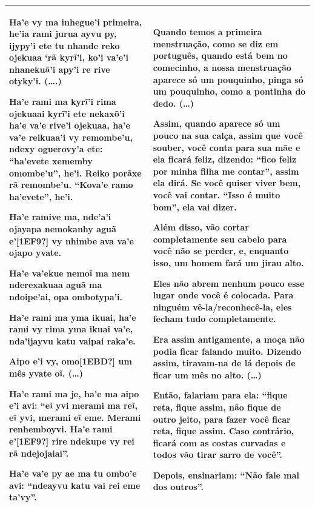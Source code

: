 \begin{flushleft}
\tablehead{}
\begin{supertabular}{m{2.87756in}|m{2.87886in}}
Ha’e vy ma inhegue’i primeira, he’ia rami jurua ayvu py, ijypy’i ete tu
nhande reko ojekuaa ‘rã kyrĩ’i, ko’i va’e’i nhanekuã’i apy’i re rive
otyky’i. (\ldots{}.)

Ha’e rami ma kyrĩ’i rima ojekuaai kyrĩ’i ete nekaxõ’i ha’e va’e
rive’i ojekuaa, ha’e va’e reikuaa’i vy remombe’u, ndexy oguerovy’a ete:
``ha’evete xememby omombe’u'', he’i. Reiko porãxe rã remombe’u. ``Kova’e
ramo ha’evete'', he’i.

Ha’e ramive ma, nde’a’i ojayapa nemokanhy aguã e’[1EF9?] vy nhimbe ava
va’e ojapo yvate. 

Ha’e va’ekue nemoĩ ma nem nderexakuaa aguã ma ndoipe’ai, opa
ombotypa’i. 

Ha’e rami ma yma ikuai, ha’e rami vy rima yma ikuai va’e, nda’ijayvu
katu vaipai raka’e.

Aipo e’i vy, omo[1EBD?] um mês yvate oĩ. (\ldots{})

Ha’e rami ma je, ha’e ma aipo e’i avi: ``eĩ yvi merami ma reĩ,
eĩ yvi, merami eĩ eme. Merami renhemboyvi. Ha’e rami e’[1EF9?]
rire ndekupe vy rei rã ndejojaiai''. 

Ha’e va’e py ae ma tu ombo’e avi: ``ndeayvu katu vai rei eme ta’vy''.  &
Quando temos a primeira menstruação, como se diz em português, quando
está bem no comecinho, a nossa menstruação aparece só um pouquinho,
pinga só um pouquinho, como a pontinha do dedo. (\ldots{})

Assim, quando aparece só um pouco na sua calça, assim que você souber,
você conta para sua mãe e ela ficará feliz, dizendo: ``fico feliz por
minha filha me contar'', assim ela dirá.  Se você quiser viver bem, você
vai contar. ``Isso é muito bom'', ela vai dizer. 

Além disso, vão cortar completamente seu cabelo para você não se perder,
e, enquanto isso, um homem fará um jirau alto. 

Eles não abrem nenhum pouco esse lugar onde você é colocada. Para
ninguém vê-la/reconhecê-la, eles fecham tudo completamente.

Era assim antigamente, a moça não podia ficar falando muito. Dizendo
assim, tiravam-na de lá depois de ficar um mês no alto. (\ldots{})

Então, falariam para ela: ``fique reta, fique assim, não fique de outro
jeito, para fazer você ficar reta, fique assim. Caso contrário, ficará
com as costas curvadas e todos vão tirar sarro de você''.  

Depois, ensinariam: ``Não fale mal dos outros''.\\\hline
\end{supertabular}
\end{flushleft}
